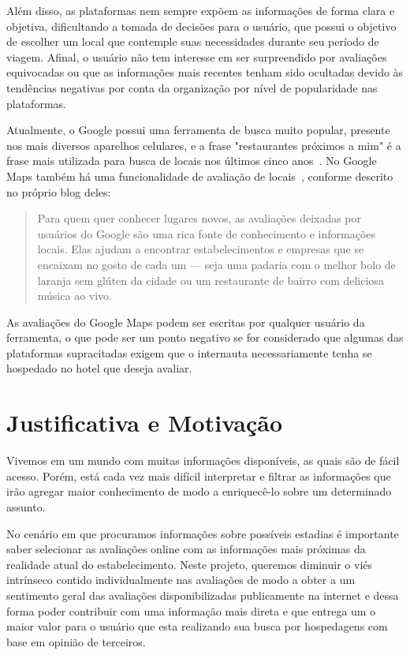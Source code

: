 Além disso, as plataformas nem sempre expõem as informações de forma clara e objetiva, dificultando a tomada de decisões para o usuário, que possui o objetivo de escolher um local que contemple suas necessidades durante seu período de viagem. Afinal, o usuário não tem interesse em ser surpreendido por avaliações equivocadas ou que as informações mais recentes tenham sido ocultadas devido às tendências negativas por conta da organização por nível de popularidade nas plataformas.

Atualmente, o Google possui uma ferramenta de busca muito popular, presente nos mais diversos aparelhos celulares, e a frase "restaurantes próximos a mim" é a frase mais utilizada para busca de locais nos últimos cinco anos~\cite{li20213}. No Google Maps também há uma funcionalidade de avaliação de locais~\cite{googleMaps2022Blog}, conforme descrito no próprio blog deles:

\begin{quote}
	Para quem quer conhecer lugares novos, as avaliações deixadas por usuários do Google são uma rica fonte de conhecimento e informações locais. Elas ajudam a encontrar estabelecimentos e empresas que se encaixam no gosto de cada um — seja uma padaria com o melhor bolo de laranja sem glúten da cidade ou um restaurante de bairro com deliciosa música ao vivo.
\end{quote}

As avaliações do Google Maps podem ser escritas por qualquer usuário da ferramenta, o que pode ser um ponto negativo se for considerado que algumas das plataformas supracitadas exigem que o internauta necessariamente tenha se hospedado no hotel que deseja avaliar.

\section{Justificativa e Motivação}

Vivemos em um mundo com muitas informações disponíveis, as quais são de fácil acesso. Porém, está cada vez mais difícil interpretar e filtrar as informações que irão agregar maior conhecimento de modo a enriquecê-lo sobre um determinado assunto.

No cenário em que procuramos informações sobre possíveis estadias é importante saber selecionar as avaliações online com as informações mais próximas da realidade atual do estabelecimento. Neste projeto, queremos diminuir o viés intrínseco contido individualmente nas avaliações de modo a obter a um sentimento geral das avaliações disponibilizadas publicamente na internet e dessa forma poder contribuir com uma informação mais direta e que entrega um o maior valor para o usuário que esta realizando sua busca por hospedagens com base em opinião de terceiros.

